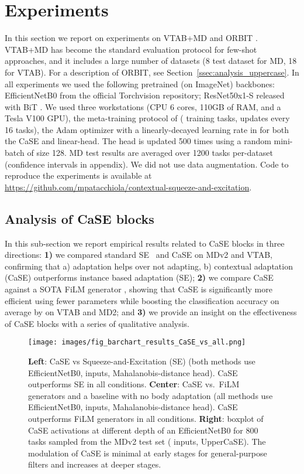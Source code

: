 \documentclass{article}
\begin{document}
\section{Experiments} \label{sec:experiments}

In this section we report on experiments on VTAB+MD \citep{dumoulin2021comparing} and ORBIT \citep{massiceti2021orbit}. VTAB+MD has become the standard evaluation protocol for few-shot approaches, and it includes a large number of datasets (8 test dataset for MD, 18 for VTAB).
For a description of ORBIT, see Section~\ref{ssec:analysis_uppercase}. In all experiments we used the following pretrained (on ImageNet) backbones: EfficientNetB0 from the official Torchvision repository; ResNet50x1-S released with BiT \citep{kolesnikov2020big}. We used three workstations (CPU 6 cores, 110GB of RAM, and a Tesla V100 GPU), the meta-training protocol of \cite{bronskill2021memory} ( training tasks, updates every 16 tasks), the Adam optimizer with a linearly-decayed learning rate in  for both the CaSE and linear-head. The head is updated 500 times using a random mini-batch of size 128. MD test results are averaged over 1200 tasks per-dataset (confidence intervals in appendix). We did not use data augmentation. Code to reproduce the experiments is available at \url{https://github.com/mpatacchiola/contextual-squeeze-and-excitation}.


\subsection{Analysis of CaSE blocks} \label{ssec:analysis_case}

In this sub-section we report empirical results related to CaSE blocks in three directions: \textbf{1)} we compared standard SE~\citep{hu2018squeeze} and CaSE on MDv2 and VTAB, confirming that a) adaptation helps over not adapting, b) contextual adaptation (CaSE) outperforms instance based adaptation (SE); \textbf{2)} we compare CaSE against a SOTA FiLM generator \citep{bronskill2021memory}, showing that CaSE is significantly more efficient using  fewer parameters while boosting the classification accuracy on average by  on VTAB and MD2; and \textbf{3)} we provide an insight on the effectiveness of CaSE blocks with a series of qualitative analysis.

\begin{figure}[t]
  \centering
  \texttt{[image: images/fig\_barchart\_results\_CaSE\_vs\_all.png]}
  \caption{\textbf{Left}: CaSE vs Squeeze-and-Excitation (SE) (both methods use EfficientNetB0,  inputs, Mahalanobis-distance head). CaSE outperforms SE in all conditions. \textbf{Center}: CaSE vs.~FiLM generators \citep{bronskill2021memory} and a baseline with no body adaptation (all methods use EfficientNetB0,  inputs, Mahalanobis-distance head). CaSE outperforms FiLM generators in all conditions. \textbf{Right}: boxplot of CaSE activations at different depth of an EfficientNetB0 for 800 tasks sampled from the MDv2 test set ( inputs, UpperCaSE). The modulation of CaSE is minimal at early stages for general-purpose filters and increases at deeper stages.}
  \label{fig:barchart_case_vs_all}
\end{figure}
\end{document}
